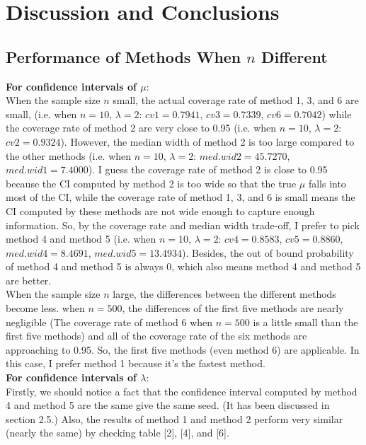 \documentclass[12pt]{article}
\begin{document}
\section{Discussion and Conclusions}
\subsection{Performance of Methods When $n$ Different}
\textbf{For confidence intervals of $\mu$}:\\
 When the sample size $n$ small, the actual coverage rate of method 1, 3, and 6 are small, (i.e. when $n=10$, $\lambda=2$: $cv1=0.7941$, $cv3=0.7339$, $cv6=0.7042$) while the coverage rate of method 2 are very close to 0.95 (i.e. when $n=10$, $\lambda=2$: $cv2=0.9324$). However, the median width of method 2 is too large compared to the other methods (i.e. when $n=10$, $\lambda=2$: $med.wid2=45.7270$, $med.wid1=7.4000$).  I guess the coverage rate of method 2 is close to 0.95 because the CI computed by method 2 is too wide so that the true $\mu$ falls into most of the CI, while the coverage rate of method 1, 3, and 6 is small means the CI computed by these methods are not wide enough to capture enough information.  So, by the coverage rate and median width trade-off, I prefer to pick method 4 and method 5 (i.e. when $n=10$, $\lambda=2$:  $cv4=0.8583$, $cv5=0.8860$, $med.wid4=8.4691$, $med.wid5=13.4934$). Besides, the out of bound probability of method 4 and method 5 is always $0$, which also means method 4 and method 5 are better.\\

When the sample size $n$ large, the differences between the different methods become less. when $n=500$, the differences of the first five methods are nearly negligible (The coverage rate of method 6 when $n=500$ is a little small than the first five methods) and all of the coverage rate of the six methods are approaching to 0.95. So, the first five methods (even method 6) are applicable. In this case, I prefer method 1 because it's the fastest method. \\

\textbf{For confidence intervals of $\lambda$}:\\
Firstly, we should notice a fact that the confidence interval computed by method 4 and method 5 are the same give the same seed. (It has been discussed in section 2.5.)  Also, the results of method 1 and method 2 perform very similar (nearly the same) by checking table [2], [4], and [6].\\
\end{document}

